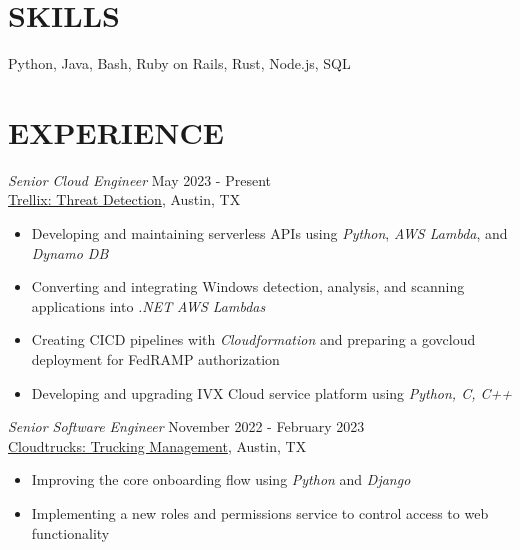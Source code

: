 \documentclass[margin, 9pt]{res} %
\begin{document}
\begin{resume}

\section{SKILLS}

Python, Java, Bash, Ruby on Rails, Rust, Node.js, SQL
 
 
\section{EXPERIENCE}
{\sl Senior Cloud Engineer} \hfill May 2023 - Present \\
\href{https://www.trellix.com/}{Trellix: Threat Detection}, Austin, TX
\begin{itemize}
    \item Developing and maintaining serverless APIs using {\it Python}, {\it AWS Lambda}, and {\it Dynamo DB}
    \item Converting and integrating Windows detection, analysis, and scanning applications into {\it .NET} {\it AWS Lambdas}
    \item Creating CICD pipelines with {\it Cloudformation} and preparing a govcloud deployment for FedRAMP authorization
    \item Developing and upgrading IVX Cloud service platform using {\it Python, C, C++}
\end{itemize}


{\sl Senior Software Engineer} \hfill November 2022 - February 2023 \\
\href{https://www.cloudtrucks.com/}{Cloudtrucks: Trucking Management}, Austin, TX
\begin{itemize}
    \item Improving the core onboarding flow using {\it Python} and {\it Django}
    \item Implementing a new roles and permissions service to control access to web functionality
\end{itemize}


\end{resume}
\end{document}
